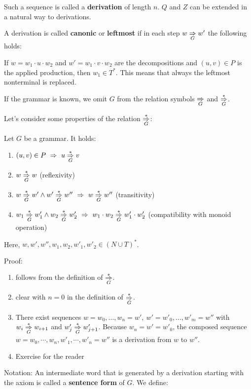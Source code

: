 Such a sequence is called a {\bf derivation} of length $n$. $Q$ and $Z$ can be
extended in a natural way to derivations.

A derivation is called {\bf canonic} or {\bf leftmost} if in each step $w
\underset{G}{\Rightarrow} w'$ the following holds:

If $w = w_1 \cdot u \cdot w_2$ and $w' = w_1 \cdot v \cdot w_2$ are the
decompositions and $(u, v) \in P$ is the applied production, then $w_1 \in T^*$.
This means that always the leftmost nonterminal is replaced.

If the grammar is known, we omit $G$ from the relation
symbols $\underset{G}{\Rightarrow}$ and $\underset{G}{\overset{*}{\Rightarrow}}$. 

Let's consider some properties of the
relation $\underset{G}{\overset{*}{\Rightarrow}}$:

\begin{lemma}
Let $G$ be a grammar. It holds:
\begin{enumerate}
  \item $(u, v) \in P \ \Rightarrow\ u \underset{G}{\overset{*}{\Rightarrow}} v$
  \item $w \underset{G}{\overset{*}{\Rightarrow}} w$ (reflexivity)
  \item $w \underset{G}{\overset{*}{\Rightarrow}} w' \wedge w' \underset{G}{\overset{*}{\Rightarrow}} w'' \ \Rightarrow\ w \underset{G}{\overset{*}{\Rightarrow}}
  w''$ (transitivity)
  \item $w_1 \underset{G}{\overset{*}{\Rightarrow}} w'_1 \wedge w_2 \underset{G}{\overset{*}{\Rightarrow}} w'_2\ \Rightarrow\ w_1
  \cdot w_2 \underset{G}{\overset{*}{\Rightarrow}} w'_1 \cdot w'_2$ (compatibility with monoid operation)
\end{enumerate}
Here, $w, w', w'', w_1, w_2, w'_1, w'_2 \in (N \cup T)^*$.
\end{lemma}

Proof:
\begin{enumerate}
  \item follows from the definition of $\underset{G}{\overset{*}{\Rightarrow}}$.
  \item clear with $n = 0$ in the definition of $\underset{G}{\overset{*}{\Rightarrow}}$.
  \item There exist sequences $w = w_0, \ldots, w_n = w',\ w' = w'_0, \ldots,
  w'_m = w''$ with $w_i \underset{G}{\overset{*}{\Rightarrow}} w_{i+1}$ and $w'_j \underset{G}{\overset{*}{\Rightarrow}} w'_{j+1}$.
  Because $w_n = w' = w'_0$, the composed sequence $w = w_0, \cdots, w_n, w'_1,
  \cdots, w'_n = w''$ is a derivation from $w$ to $w''$.
  \item Exercise for the reader
\end{enumerate}

Notation: An intermediate word that is generated by a derivation starting with
the axiom is called a {\bf sentence form} of $G$. We define:

